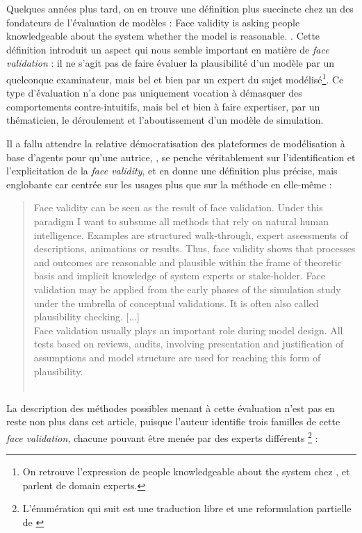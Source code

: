 Quelques années plus tard, on en trouve une définition plus succincte chez un des fondateurs de l'évaluation de modèles : \og Face validity is asking people knowledgeable about the system whether the model is reasonable.\fg{} \autocite[500]{sargent_validation_1979}.
Cette définition introduit un aspect qui nous semble important en matière de \textit{face validation} : il ne s'agit pas de faire évaluer la plausibilité d'un modèle par un quelconque examinateur, mais bel et bien par un expert du sujet modélisé\footnote{
	On retrouve l'expression de \og people knowledgeable about the system\fg{} chez \textcite[130]{balci_validation_1994}, et \textcite[2]{kennedy_verification_2006} parlent de \og domain experts\fg{}.
}.
Ce type d'évaluation n'a donc pas uniquement vocation à démasquer des comportements contre-intuitifs, mais bel et bien à faire expertiser, par un thématicien, le déroulement et l'aboutissement d'un modèle de simulation.

Il a fallu attendre la relative démocratisation des plateformes de modélisation à base d'agents pour qu'une autrice, \citeauthor{klugl_validation_2008}, se penche véritablement sur l'identification et l'explicitation de la \textit{face validity}, et en donne une définition plus précise, mais englobante car centrée sur les usages plus que sur la méthode en elle-même :

\begin{quotation}
	\noindent \og
	Face validity can be seen as the result of face validation. Under this paradigm I want to subsume all methods that rely on natural human intelligence.
	Examples are structured walk-through, expert assessments of descriptions, animations or results.
	Thus, face validity shows that processes and outcomes are reasonable and plausible within the frame of theoretic basis and implicit knowledge of system experts or stake-holder.
	Face validation may be applied from the early phases of the simulation study under the umbrella of conceptual validations.
	It is often also called plausibility checking.
	[...]\\
	Face validation usually plays an important role during model design.
	All tests based on reviews, audits, involving presentation and justification of assumptions and model structure are used for reaching this form of plausibility.
	\fg{}\\
	\mbox{}~ \hfill \textcite[39--41]{klugl_validation_2008}
\end{quotation}


La description des méthodes possibles menant à cette évaluation n'est pas en reste non plus dans cet article, puisque l'auteur identifie trois familles de cette \textit{face validation}, chacune pouvant être menée par des experts différents \footnote{
	L'énumération qui suit est une traduction libre et une reformulation partielle de \textcite[41-42]{klugl_validation_2008}
} :

